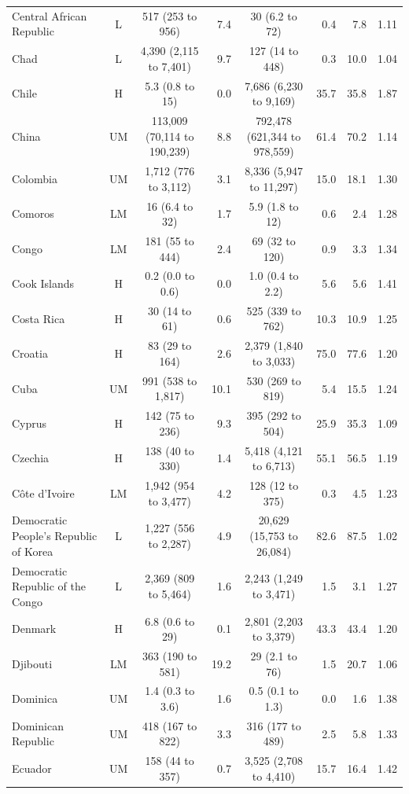 \begin{longtable}{lccrcrrr}
Central African Republic & L & 517 (253 to 956) & 7.4 & 30 (6.2 to 72) & 0.4 & 7.8 & 1.11 \\
Chad & L & 4,390 (2,115 to 7,401) & 9.7 & 127 (14 to 448) & 0.3 & 10.0 & 1.04 \\
Chile & H & 5.3 (0.8 to 15) & 0.0 & 7,686 (6,230 to 9,169) & 35.7 & 35.8 & 1.87 \\
China & UM & 113,009 (70,114 to 190,239) & 8.8 & 792,478 (621,344 to 978,559) & 61.4 & 70.2 & 1.14 \\
Colombia & UM & 1,712 (776 to 3,112) & 3.1 & 8,336 (5,947 to 11,297) & 15.0 & 18.1 & 1.30 \\
Comoros & LM & 16 (6.4 to 32) & 1.7 & 5.9 (1.8 to 12) & 0.6 & 2.4 & 1.28 \\
Congo & LM & 181 (55 to 444) & 2.4 & 69 (32 to 120) & 0.9 & 3.3 & 1.34 \\
Cook Islands & H & 0.2 (0.0 to 0.6) & 0.0 & 1.0 (0.4 to 2.2) & 5.6 & 5.6 & 1.41 \\
Costa Rica & H & 30 (14 to 61) & 0.6 & 525 (339 to 762) & 10.3 & 10.9 & 1.25 \\
Croatia & H & 83 (29 to 164) & 2.6 & 2,379 (1,840 to 3,033) & 75.0 & 77.6 & 1.20 \\
Cuba & UM & 991 (538 to 1,817) & 10.1 & 530 (269 to 819) & 5.4 & 15.5 & 1.24 \\
Cyprus & H & 142 (75 to 236) & 9.3 & 395 (292 to 504) & 25.9 & 35.3 & 1.09 \\
Czechia & H & 138 (40 to 330) & 1.4 & 5,418 (4,121 to 6,713) & 55.1 & 56.5 & 1.19 \\
Côte d'Ivoire & LM & 1,942 (954 to 3,477) & 4.2 & 128 (12 to 375) & 0.3 & 4.5 & 1.23 \\
Democratic People's Republic of Korea & L & 1,227 (556 to 2,287) & 4.9 & 20,629 (15,753 to 26,084) & 82.6 & 87.5 & 1.02 \\
Democratic Republic of the Congo & L & 2,369 (809 to 5,464) & 1.6 & 2,243 (1,249 to 3,471) & 1.5 & 3.1 & 1.27 \\
Denmark & H & 6.8 (0.6 to 29) & 0.1 & 2,801 (2,203 to 3,379) & 43.3 & 43.4 & 1.20 \\
Djibouti & LM & 363 (190 to 581) & 19.2 & 29 (2.1 to 76) & 1.5 & 20.7 & 1.06 \\
Dominica & UM & 1.4 (0.3 to 3.6) & 1.6 & 0.5 (0.1 to 1.3) & 0.0 & 1.6 & 1.38 \\
Dominican Republic & UM & 418 (167 to 822) & 3.3 & 316 (177 to 489) & 2.5 & 5.8 & 1.33 \\
Ecuador & UM & 158 (44 to 357) & 0.7 & 3,525 (2,708 to 4,410) & 15.7 & 16.4 & 1.42 \\

\end{longtable}
